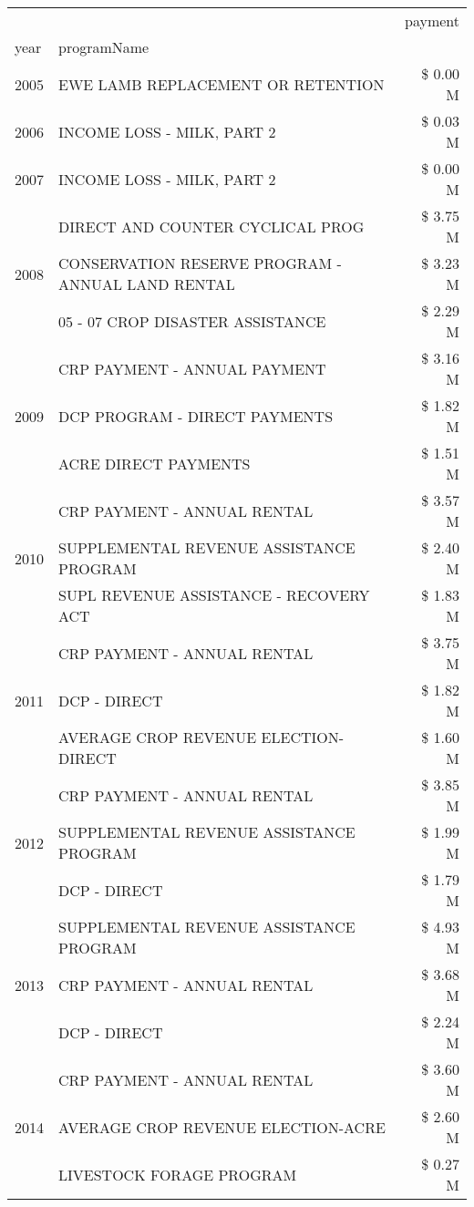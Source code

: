 \begin{tabular}{llr}
\toprule
 &  & payment \\
year & programName &  \\
\midrule
2005 & EWE LAMB REPLACEMENT OR RETENTION & \$ 0.00 M \\
\cline{1-3}
2006 & INCOME LOSS - MILK, PART 2 & \$ 0.03 M \\
\cline{1-3}
2007 & INCOME LOSS - MILK, PART 2 & \$ 0.00 M \\
\cline{1-3}
\multirow[t]{3}{*}{2008} & DIRECT AND COUNTER CYCLICAL PROG & \$ 3.75 M \\
 & CONSERVATION RESERVE PROGRAM - ANNUAL LAND RENTAL & \$ 3.23 M \\
 & 05 - 07 CROP DISASTER ASSISTANCE & \$ 2.29 M \\
\cline{1-3}
\multirow[t]{3}{*}{2009} & CRP PAYMENT - ANNUAL PAYMENT & \$ 3.16 M \\
 & DCP PROGRAM - DIRECT PAYMENTS & \$ 1.82 M \\
 & ACRE DIRECT PAYMENTS & \$ 1.51 M \\
\cline{1-3}
\multirow[t]{3}{*}{2010} & CRP PAYMENT - ANNUAL RENTAL & \$ 3.57 M \\
 & SUPPLEMENTAL REVENUE ASSISTANCE PROGRAM & \$ 2.40 M \\
 & SUPL REVENUE ASSISTANCE - RECOVERY ACT & \$ 1.83 M \\
\cline{1-3}
\multirow[t]{3}{*}{2011} & CRP PAYMENT - ANNUAL RENTAL & \$ 3.75 M \\
 & DCP - DIRECT & \$ 1.82 M \\
 & AVERAGE CROP REVENUE ELECTION-DIRECT & \$ 1.60 M \\
\cline{1-3}
\multirow[t]{3}{*}{2012} & CRP PAYMENT - ANNUAL RENTAL & \$ 3.85 M \\
 & SUPPLEMENTAL REVENUE ASSISTANCE PROGRAM & \$ 1.99 M \\
 & DCP - DIRECT & \$ 1.79 M \\
\cline{1-3}
\multirow[t]{3}{*}{2013} & SUPPLEMENTAL REVENUE ASSISTANCE PROGRAM & \$ 4.93 M \\
 & CRP PAYMENT - ANNUAL RENTAL & \$ 3.68 M \\
 & DCP - DIRECT & \$ 2.24 M \\
\cline{1-3}
\multirow[t]{3}{*}{2014} & CRP PAYMENT - ANNUAL RENTAL & \$ 3.60 M \\
 & AVERAGE CROP REVENUE ELECTION-ACRE & \$ 2.60 M \\
 & LIVESTOCK FORAGE PROGRAM & \$ 0.27 M \\

\end{tabular}
